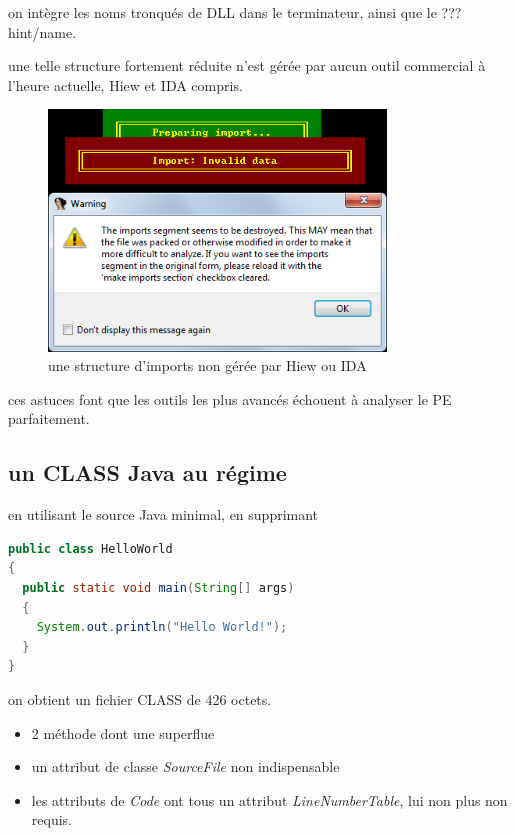 \begin{itemize}
on intègre les noms tronqués de DLL dans le terminateur, ainsi que le ??? hint/name.

une telle structure fortement réduite n'est gérée par aucun outil commercial à l'heure actuelle, Hiew et IDA compris.

\begin{figure}[ht]
  \centering
  \includegraphics[width=0.8\textwidth]{albertini/img/imports_error}
  \caption{une structure d'imports non gérée par Hiew ou IDA}
  \label{fig:albertini:imports_error}
\end{figure}

ces astuces font que les outils les plus avancés échouent à analyser le PE parfaitement.

\end{itemize}

\subsection{un CLASS Java au régime}
en utilisant le source Java minimal, en supprimant

\begin{lstlisting}[language={java},caption={un Hello World minimal en Java},label={lst:albertini:hwjava}]
 public class HelloWorld
{
  public static void main(String[] args)
  {
    System.out.println("Hello World!");
  }
}
\end{lstlisting}

on obtient un fichier CLASS de 426 octets.
\begin{itemize}
\item 2 méthode dont une superflue
\item un attribut de classe {\em SourceFile} non indispensable
\item les attributs de {\em Code} ont tous un attribut {\em LineNumberTable}, lui non plus non requis.
\end{itemize}

